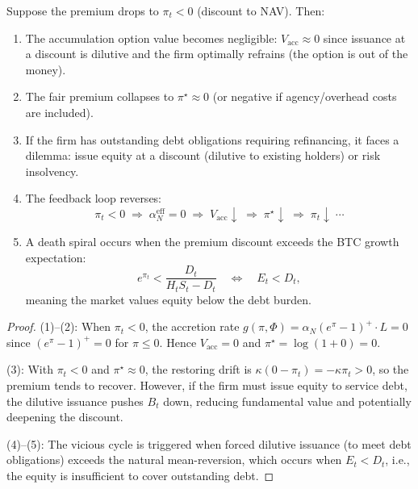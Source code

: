 \begin{theorem}
  \label{thm:death_spiral}
  Suppose the premium drops to $\pi_t < 0$ (discount to NAV).  Then:
  \begin{enumerate}
    \item The accumulation option value becomes negligible:
      $V_{\mathrm{acc}} \approx 0$ since issuance at a discount is dilutive
      and the firm optimally refrains (the option is out of the money).

    \item The fair premium collapses to $\pi^\star \approx 0$
      (or negative if agency/overhead costs are included).

    \item If the firm has outstanding debt obligations requiring refinancing,
      it faces a dilemma: issue equity at a discount (dilutive to existing
      holders) or risk insolvency.

    \item The feedback loop reverses:
      \begin{equation}
        \label{eq:death_spiral_loop}
        \pi_t < 0 \;\Longrightarrow\;
        \alpha_N^{\mathrm{eff}} = 0 \;\Longrightarrow\;
        V_{\mathrm{acc}} \downarrow \;\Longrightarrow\;
        \pi^\star \downarrow \;\Longrightarrow\;
        \pi_t \downarrow\;\cdots
      \end{equation}

    \item A death spiral occurs when the premium discount exceeds the BTC
      growth expectation:
      \begin{equation}
        \label{eq:spiral_condition}
        e^{\pi_t} < \frac{D_t}{H_t S_t - D_t}
        \quad\Longleftrightarrow\quad
        E_t < D_t,
      \end{equation}
      meaning the market values equity below the debt burden.
  \end{enumerate}
\end{theorem}

\begin{proof}
  (1)--(2): When $\pi_t < 0$, the accretion rate
  $g(\pi, \Phi) = \alpha_N(e^\pi - 1)^+ \cdot L = 0$ since
  $(e^\pi - 1)^+ = 0$ for $\pi \le 0$.  Hence
  $V_{\mathrm{acc}} = 0$ and $\pi^\star = \log(1 + 0) = 0$.

  (3): With $\pi_t < 0$ and $\pi^\star \approx 0$, the restoring drift is
  $\kappa(0 - \pi_t) = -\kappa\pi_t > 0$, so the premium tends to recover.
  However, if the firm must issue equity to service debt, the dilutive
  issuance pushes $B_t$ down, reducing fundamental value and potentially
  deepening the discount.

  (4)--(5): The vicious cycle is triggered when forced dilutive issuance
  (to meet debt obligations) exceeds the natural mean-reversion, which
  occurs when $E_t < D_t$, i.e., the equity is insufficient to cover
  outstanding debt.
\end{proof}


